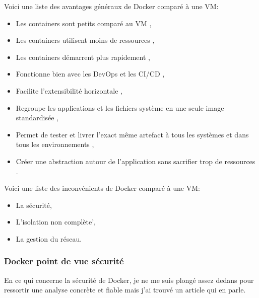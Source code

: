 \documentclass[
    iai, %
    il, %
]{heig-tb}
\begin{document}

Voici une liste des avantages généraux de Docker comparé à une VM:
\begin{itemize}
    \item Les containers sont petits comparé au VM \cite{koukia,nick}, %
    \item Les containers utilisent moins de ressources \cite{koukia},
    \item Les containers démarrent plus rapidement \cite{koukia},
    \item Fonctionne bien avec les DevOps et les CI/CD \cite{koukia,data-flair-pros-cons,data-flair-use-cases},
    \item Facilite l'extensibilité horizontale \cite{data-flair-use-cases},
    \item Regroupe les applications et les fichiers système en une seule image standardisée \cite{kane2018docker},
    \item Permet de tester et livrer l'exact même artefact à tous les systèmes et dans tous les
          environnements \cite{kane2018docker,nick},
    \item Créer une abstraction autour de l'application sans sacrifier trop de ressources \cite{kane2018docker}.
\end{itemize}

Voici une liste des inconvénients de Docker comparé à une VM:
\begin{itemize}
    \item La sécurité, \cite{koukia}
    \item L'isolation non complète', \cite{koukia}
    \item La gestion du réseau. \cite{koukia}
\end{itemize}

\subsubsection{Docker point de vue sécurité}
En ce qui concerne la sécurité de Docker, je ne me suis plongé assez dedans pour ressortir une
analyse concrète et fiable mais j'ai trouvé un article qui en parle. \cite{combe}

\end{document}
